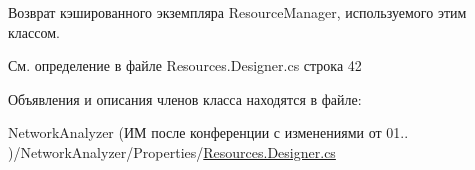 Возврат кэшированного экземпляра Resource\+Manager, используемого этим классом. 



См. определение в файле Resources.\+Designer.\+cs строка 42



Объявления и описания членов класса находятся в файле\+:\begin{DoxyCompactItemize}
\item 
Network\+Analyzer (ИМ после конференции  с изменениями от 01.. )/\+Network\+Analyzer/\+Properties/\hyperlink{_resources_8_designer_8cs}{Resources.\+Designer.\+cs}\end{DoxyCompactItemize}
